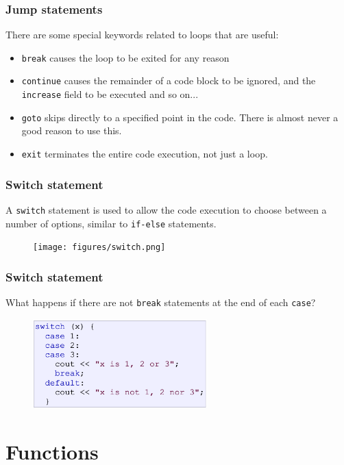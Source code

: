\documentclass{if-beamer}
\begin{document}
\begin{frame}
\frametitle{Jump statements}
There are some special keywords related to loops that are useful:
\begin{itemize}
\item \texttt{break} causes the loop to be exited for any reason
\item \texttt{continue} causes the remainder of a code block to be
ignored, and the \texttt{increase} field to be executed and so
on...
\item \texttt{goto} skips directly to a specified point in the code. There is almost never a good reason to use this.
\item \texttt{exit} terminates the entire code execution, not just a loop.
\end{itemize}
\end{frame}

\begin{frame}
\frametitle{Switch statement}
\vspace{1cm}
A \texttt{switch} statement is used to allow the code execution to
choose between a number of options, similar to \texttt{if-else}
statements.
\begin{figure}
\center
\texttt{[image: figures/switch.png]}
\end{figure}
\end{frame}

\begin{frame}
\frametitle{Switch statement}
What happens if there are not \texttt{break} statements at the end of each \texttt{case}?
\begin{figure}
\center
\includegraphics[width=0.6\textwidth]{figures/switch2.png}
\end{figure}
\end{frame}

\section{Functions}
\end{document}
